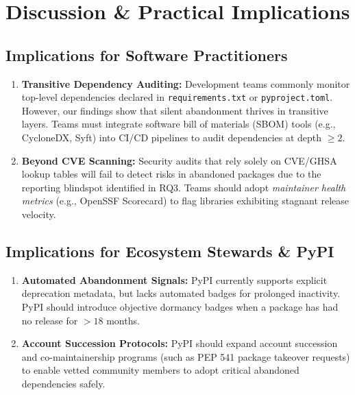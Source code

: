 \documentclass[conference]{IEEEtran}
\begin{document}
\vspace{2mm}
\noindent{}
\vspace{2mm}

\section{Discussion \& Practical Implications}

\subsection{Implications for Software Practitioners}

\begin{enumerate}
    \item \textbf{Transitive Dependency Auditing:} Development teams commonly monitor top-level dependencies declared in \texttt{requirements.txt} or \texttt{pyproject.toml}. However, our findings show that silent abandonment thrives in transitive layers. Teams must integrate software bill of materials (SBOM) tools (e.g., CycloneDX, Syft) into CI/CD pipelines to audit dependencies at depth $\ge 2$.
    \item \textbf{Beyond CVE Scanning:} Security audits that rely solely on CVE/GHSA lookup tables will fail to detect risks in abandoned packages due to the reporting blindspot identified in RQ3. Teams should adopt \textit{maintainer health metrics} (e.g., OpenSSF Scorecard) to flag libraries exhibiting stagnant release velocity.
\end{enumerate}

\subsection{Implications for Ecosystem Stewards \& PyPI}

\begin{enumerate}
    \item \textbf{Automated Abandonment Signals:} PyPI currently supports explicit deprecation metadata, but lacks automated badges for prolonged inactivity. PyPI should introduce objective dormancy badges when a package has had no release for $>18$ months.
    \item \textbf{Account Succession Protocols:} PyPI should expand account succession and co-maintainership programs (such as PEP 541 package takeover requests) to enable vetted community members to adopt critical abandoned dependencies safely.
\end{enumerate}
\end{document}
